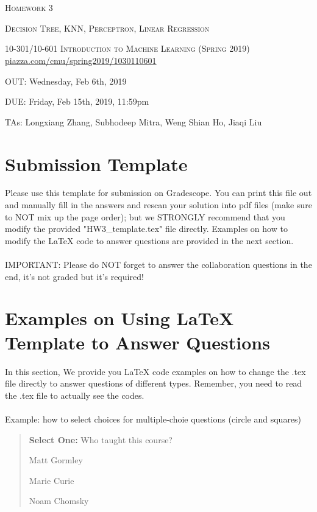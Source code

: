 \documentclass[12pt]{article}
\begin{document}
\section*{}
\begin{center}
  \centerline{\textsc{\Large  Homework 3}}
  \vspace{0.5em}
  \centerline{\textsc{\Large{Decision Tree, KNN, Perceptron, Linear Regression}}}
  \vspace{1em}
  \textsc{\large 10-301/10-601 Introduction to Machine Learning (Spring 2019)} \\
  \vspace{0.5em}
  \url{piazza.com/cmu/spring2019/1030110601} \\
  \vspace{0.5em}
  \centerline{OUT: Wednesday, Feb 6th, 2019}
  \vspace{0.5em}
  \centerline{DUE: Friday, Feb 15th, 2019, 11:59pm}
    \centerline{TAs: Longxiang Zhang, Subhodeep Mitra, Weng Shian Ho, Jiaqi Liu}
\end{center}


\section*{Submission Template}

\begin{notebox}
Please use this template for submission on Gradescope. You can print this file out and manually fill in the answers and rescan your solution into pdf files (make sure to NOT mix up the page order); but we STRONGLY recommend that you modify the provided "HW3\_template.tex" file directly. Examples on how to modify the \LaTeX{} code to answer questions are provided in the next section.\\ \\
IMPORTANT: Please do NOT forget to answer the collaboration questions in the end, it's not graded but it's required!
\end{notebox}
\clearpage

\section*{Examples on Using \LaTeX{} Template to Answer Questions}
In this section, We provide you \LaTeX{} code examples on how to change the .tex file directly to answer questions of different types. Remember, you need to read the .tex file to actually see the codes.\\ \\
Example: how to select choices for multiple-choie questions (circle and squares)
\begin{quote}
\textbf{Select One:} Who taught this course?
\begin{list}{}
     \item\CIRCLE{} Matt Gormley
     \item\Circle{} Marie Curie
     \item\Circle{} Noam Chomsky
\end{list}
\end{quote}
\end{document}
